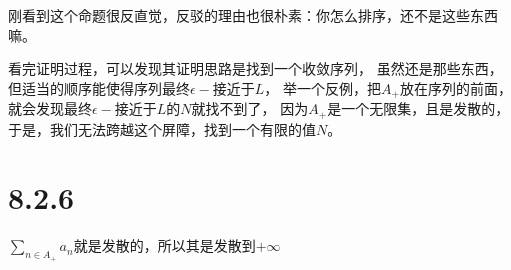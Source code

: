 \documentclass{article}
\begin{document}
\begin{zremark}
  刚看到这个命题很反直觉，反驳的理由也很朴素：你怎么排序，还不是这些东西嘛。

  看完证明过程，可以发现其证明思路是找到一个收敛序列，
  虽然还是那些东西，但适当的顺序能使得序列最终$\epsilon-$接近于$L$，
  举一个反例，把$A_{+}$放在序列的前面，就会发现最终$\epsilon-$接近于$L$的$N$就找不到了，
  因为$A_{+}$是一个无限集，且是发散的，于是，我们无法跨越这个屏障，找到一个有限的值$N$。
\end{zremark}

\section*{8.2.6}

$\sum \limits_{n \in A_{+}} a_n$就是发散的，所以其是发散到$+\infty$
\end{document}
